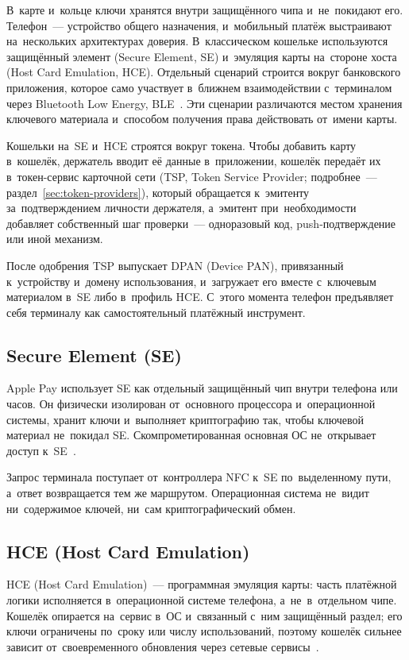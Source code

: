 В~карте и~кольце ключи хранятся внутри защищённого чипа и~не~покидают его.
Телефон~--- устройство общего назначения, и~мобильный платёж выстраивают
на~нескольких архитектурах доверия. В~классическом кошельке используются
защищённый элемент (Secure Element, SE) и~эмуляция карты на~стороне хоста (Host
Card Emulation, HCE). Отдельный сценарий строится вокруг банковского
приложения, которое само участвует в~ближнем взаимодействии с~терминалом через
Bluetooth Low Energy, BLE~\cite{emvco-mobile,nspk-volna-demo-2025}. Эти
сценарии различаются местом хранения ключевого материала и~способом получения
права действовать от~имени карты.

Кошельки на~SE и~HCE строятся вокруг токена. Чтобы добавить карту в~кошелёк,
держатель вводит её данные в~приложении, кошелёк передаёт их в~токен-сервис
карточной сети (TSP, Token Service Provider;
подробнее~--- раздел~\ref{sec:token-providers}), который обращается к~эмитенту
за~подтверждением личности держателя, а~эмитент при~необходимости добавляет
собственный шаг проверки~--- одноразовый код, push-подтверждение или иной
механизм.

После одобрения TSP выпускает DPAN (Device PAN), привязанный к~устройству
и~домену использования, и~загружает его вместе с~ключевым материалом в~SE либо
в~профиль HCE. С~этого момента телефон предъявляет себя терминалу как
самостоятельный платёжный инструмент.

\subsection*{Secure Element (SE)}

Apple Pay использует SE как отдельный защищённый чип внутри телефона или часов.
Он физически изолирован от~основного процессора и~операционной системы, хранит
ключи и~выполняет криптографию так, чтобы ключевой материал не~покидал SE.
Скомпрометированная основная ОС не~открывает доступ
к~SE~\cite{apple-pay-security}.

Запрос терминала поступает от~контроллера NFC к~SE по~выделенному пути, а~ответ
возвращается тем же маршрутом.
Операционная система не~видит ни~содержимое ключей, ни~сам криптографический
обмен.

\subsection*{HCE (Host Card Emulation)}

HCE (Host Card Emulation)~--- программная эмуляция карты: часть платёжной
логики исполняется в~операционной системе телефона, а~не~в~отдельном чипе.
Кошелёк опирается на~сервис в~ОС и~связанный с~ним защищённый раздел; его
ключи ограничены по~сроку или числу использований, поэтому кошелёк сильнее
зависит от~своевременного обновления через сетевые
сервисы~\cite{android-hce-overview,google-pay-device-tokenization-security}.

